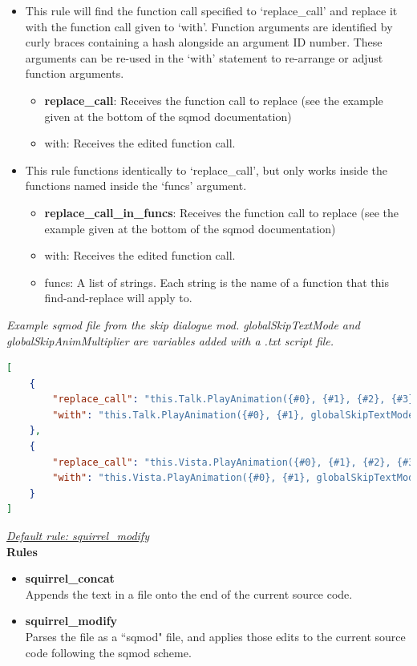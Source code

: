\documentclass{article}
\begin{document}
\begin{itemize}
\begin{itemize}
\item This rule will find the function call specified to `replace\_call' and replace it with the function call given to `with'. Function arguments are identified by curly braces containing a hash alongside an argument ID number. These arguments can be re-used in the `with' statement to re-arrange or adjust function arguments.
\begin{itemize}
\item \textbf{replace\_call}: Receives the function call to replace (see the example given at the bottom of the sqmod documentation)
\item with: Receives the edited function call.
\end{itemize}

\item This rule functions identically to `replace\_call', but only works inside the functions named inside the `funcs' argument.
\begin{itemize}
\item \textbf{replace\_call\_in\_funcs}: Receives the function call to replace (see the example given at the bottom of the sqmod documentation)
\item with: Receives the edited function call.
\item funcs: A list of strings. Each string is the name of a function that this find-and-replace will apply to.
\end{itemize}
\end{itemize}
\end{itemize}

\textit{Example sqmod file from the skip dialogue mod. globalSkipTextMode and globalSkipAnimMultiplier are variables added with a .txt script file.}
\begin{lstlisting}[language=json,firstnumber=1]
[
    {
        "replace_call": "this.Talk.PlayAnimation({#0}, {#1}, {#2}, {#3})",
        "with": "this.Talk.PlayAnimation({#0}, {#1}, globalSkipTextMode ? ({#2}/globalSkipAnimMultiplier) : ({#2}), {#3})"
    },
    {
        "replace_call": "this.Vista.PlayAnimation({#0}, {#1}, {#2}, {#3})",
        "with": "this.Vista.PlayAnimation({#0}, {#1}, globalSkipTextMode ? ({#2}/globalSkipAnimMultiplier) : ({#2}), {#3})"
    }
]
\end{lstlisting}

\underline{\textit{Default rule: squirrel\_modify}}\\

\textbf{Rules}
\begin{itemize}
	\item \textbf{squirrel\_concat}\\
	Appends the text in a file onto the end of the current source code.
	\item \textbf{squirrel\_modify}\\
	Parses the file as a ``sqmod" file, and applies those edits to the current source code following the sqmod scheme.
\end{itemize}
\end{document}
